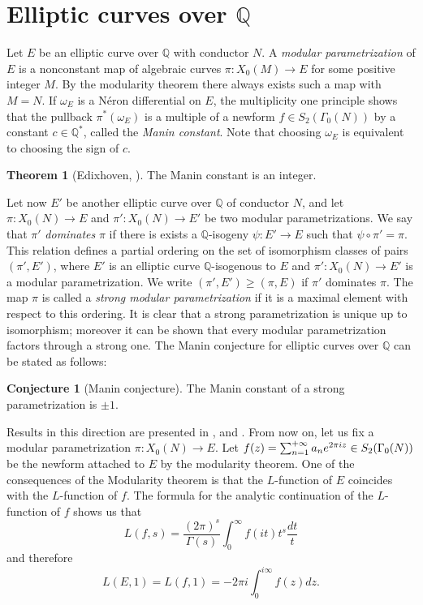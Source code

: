 \documentclass[11pt]{amsart}
\theoremstyle{definition}
\newtheorem{thm}[definizione]{Theorem}
\newtheorem{conj}[definizione]{Conjecture}
\begin{document}
	\section{Elliptic curves over \texorpdfstring{${\mathbb{Q}}$}{}}\label{curvesoverQ}
		Let $E$ be an elliptic curve over ${\mathbb{Q}}$ with conductor $N$. A \emph{modular parametrization} of $E$ is a nonconstant map of algebraic curves $\pi \colon X_0(M) \to E$ for some positive integer $M$. By the modularity theorem there always exists such a map with $M=N$. If $\omega_E$ is a N\'{e}ron differential on $E$, the multiplicity one principle shows that the pullback $\pi^*(\omega_E)$ is a multiple of a newform $f\in S_2(\Gamma_0(N))$ by a constant $c\in {\mathbb{Q}}^*$, called the \emph{Manin constant}. Note that choosing $\omega_E$ is equivalent to choosing the sign of $c$.
		\begin{thm}[Edixhoven, \cite{edi}]\label{manconisint}
				The Manin constant is an integer.
		\end{thm}
		Let now $E'$ be another elliptic curve over ${\mathbb{Q}}$ of conductor $N$, and let $\pi\colon X_0(N)\to E$ and $\pi'\colon X_0(N)\to E'$ be two modular parametrizations. We say that $\pi'$ 
		\emph{dominates} $\pi$ if there is exists a ${\mathbb{Q}}$-isogeny $\psi\colon E'\to E$ such that $\psi\circ \pi'=\pi$. This relation defines a partial ordering on the set of isomorphism classes of pairs $(\pi',E')$, where $E'$ is an elliptic curve ${\mathbb{Q}}$-isogenous to $E$ and $\pi'\colon X_0(N)\to E'$ is a modular parametrization. We write $(\pi',E')\geq (\pi,E)$ if $\pi'$ dominates $\pi$. The map $\pi$ is called a \emph{strong modular parametrization} if it is a maximal element with respect to this ordering. It is clear that a strong parametrization is unique up to isomorphism; moreover it can be shown that every modular parametrization factors through a strong one. The Manin conjecture for elliptic curves over ${\mathbb{Q}}$ can be stated as follows:
			\begin{conj}[Manin conjecture]\label{mancon}
				The Manin constant of a strong parametrization is $\pm 1$.
		\end{conj}
		Results in this direction are presented in \cite{maz}, \cite{edi} and \cite{abul}.
		From now on, let us fix a modular parametrization $\pi\colon X_0(N)\to E$. Let ${\displaystyle} f(z)=\sum_{n=1}^{+\infty}a_ne^{2\pi iz}\in S_2(\Gamma_0(N))$ be the newform attached to $E$ by the modularity theorem. One of the consequences of the Modularity theorem is that the $L$-function of $E$ coincides with the $L$-function of $f$. The formula for the analytic continuation of the $L$-function of $f$ shows us that
  		$$L(f,s)=\frac{(2\pi)^s}{\Gamma(s)}\int_0^{\infty}f(it)t^s\frac{dt}{t}$$
  		and therefore
 			\begin{equation}\label{Lvalue}
  				L(E,1)=L(f,1)=-2\pi i\int_0^{i\infty}f(z)dz.
 		\end{equation}
  		
\end{document}
